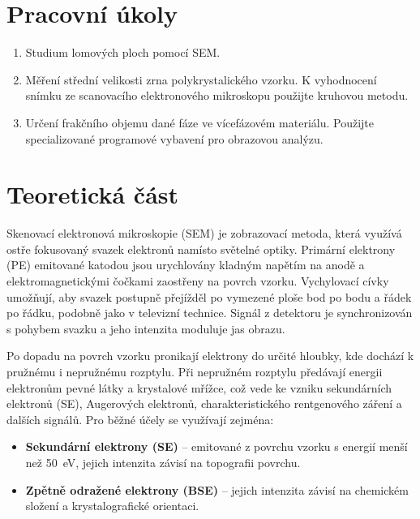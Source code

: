 \section{Pracovní úkoly}

\begin{enumerate}
\item Studium lomových ploch pomocí SEM.

\item Měření střední velikosti zrna polykrystalického vzorku. K vyhodnocení snímku ze scanovacího elektronového mikroskopu použijte kruhovou metodu.

\item Určení frakčního objemu dané fáze ve vícefázovém materiálu. Použijte specializované programové vybavení pro obrazovou analýzu.
\end{enumerate}

\section{Teoretická část}

Skenovací elektronová mikroskopie (SEM) je zobrazovací metoda, která využívá ostře fokusovaný svazek elektronů namísto světelné optiky. Primární elektrony (PE) emitované katodou jsou urychlovány kladným napětím na anodě a elektromagnetickými čočkami zaostřeny na povrch vzorku. Vychylovací cívky umožňují, aby svazek postupně přejížděl po vymezené ploše bod po bodu a řádek po řádku, podobně jako v televizní technice. Signál z detektoru je synchronizován s pohybem svazku a jeho intenzita moduluje jas obrazu.

Po dopadu na povrch vzorku pronikají elektrony do určité hloubky, kde dochází k pružnému i nepružnému rozptylu. Při nepružném rozptylu předávají energii elektronům pevné látky a krystalové mřížce, což vede ke vzniku sekundárních elektronů (SE), Augerových elektronů, charakteristického rentgenového záření a dalších signálů. Pro běžné účely se využívají zejména:
\begin{itemize}
    \item \textbf{Sekundární elektrony (SE)} – emitované z povrchu vzorku s energií menší než 50~eV, jejich intenzita závisí na topografii povrchu.
    \item \textbf{Zpětně odražené elektrony (BSE)} – jejich intenzita závisí na chemickém složení a krystalografické orientaci.
\end{itemize}

